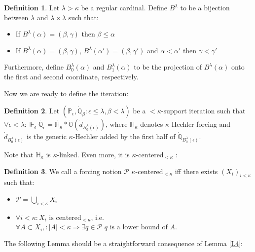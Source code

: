 \documentclass[12pt,a4paper]{scrartcl}
\theoremstyle{definition}
\newtheorem{definition}{Definition}[section]
\numberwithin{equation}{section}
\begin{document}
\begin{definition}
Let $\lambda > \kappa$ be a regular cardinal. Define $B^\lambda$ to be a bijection between $\lambda$ and $\lambda \times \lambda$ such that:
\begin{itemize}
\item If $B^\lambda(\alpha)=(\beta,\gamma)$ then $\beta \leq \alpha$
\item If $B^\lambda(\alpha)=(\beta, \gamma)$, $B^\lambda(\alpha')=(\beta, \gamma')$ and $\alpha < \alpha'$ then $\gamma < \gamma'$
\end{itemize}
Furthermore, define $B_0^\lambda(\alpha)$ and $B_1^\lambda(\alpha)$ to be the projection of $B^\lambda(\alpha)$ onto the first and second coordinate, respectively.
\end{definition}

Now we are ready to define the iteration:

\begin{definition}
Let $(\mathbb{P}_\epsilon, \dot{\mathbb{Q}}_\beta \colon \epsilon \leq \lambda, \beta < \lambda)$ be a ${<}\kappa$-support iteration such that $\forall \epsilon < \lambda  \colon \Vdash_\epsilon \dot{\mathbb{Q}_\epsilon}= \dot{\mathbb{H}_\kappa} * \dot{\mathbb{O}}(\dot{d}_{B_0^\lambda(\epsilon)})$, where $\mathbb{H}_\kappa$ denotes $\kappa$-Hechler forcing and $\dot{d}_{B_0^\lambda(\epsilon)}$ is the generic $\kappa$-Hechler added by the first half of $\dot{\mathbb{Q}}_{B_0^\lambda(\epsilon)}$.
\end{definition}

Note that $\mathbb{H}_\kappa$ is $\kappa$-linked. Even more, it is $\kappa$-$\text{centered}_{<\kappa}$ :

\begin{definition} \label{D1}
We call a forcing notion $\mathcal{P}$ $\kappa$-$\text{centered}_{<\kappa}$ iff there exists $(X_i)_{i<\kappa}$ such that:
\begin{itemize}
\item $\mathcal{P}= \bigcup_{i< \kappa} X_i$
\item $\forall i < \kappa \colon X_i \,\, \text{is} \,\, \text{centered}_{<\kappa}$, i.e. $\forall A \subset  X_i, \colon \vert A \vert < \kappa \Rightarrow \exists q \in \mathcal{P} \,\, q \,\, \text{is a lower bound of} \,\, A$.
\end{itemize}
\end{definition}

The following Lemma should be a straightforward consequence of Lemma \ref{L4}:
\end{document}
